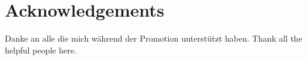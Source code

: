 \chapter*{Acknowledgements}

Danke an alle die mich während der Promotion unterstützt haben.
\vskip 0.2cm
%
Thank all the helpful people here.



